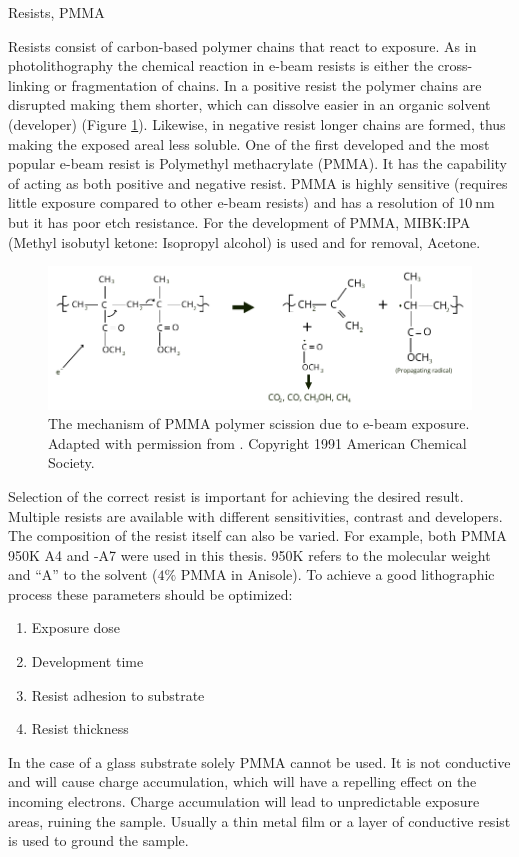 \documentclass[draft]{jyflluk}
\begin{document}
Resists, PMMA

Resists consist of carbon-based polymer chains that react to exposure. As in photolithography the chemical reaction in e-beam resists is either the cross-linking or fragmentation of chains. In a positive resist the polymer chains are disrupted making them shorter, which can dissolve easier in an organic solvent (developer) (Figure \ref{fig:PMMA_chem}). Likewise, in negative resist longer chains are formed, thus making the exposed areal less soluble. One of the first developed and the most popular e-beam resist is Polymethyl methacrylate (PMMA). It has the capability of acting as both positive and negative resist. PMMA is highly sensitive (requires little exposure compared to other e-beam resists) and has a resolution of $\SI{10}{\nano \metre}$ but it has poor etch resistance. For the development of PMMA, MIBK:IPA (Methyl isobutyl ketone: Isopropyl alcohol) is used and for removal, Acetone. \cite{EBL_GOOD}

\begin{figure}[h]
    \centering
    \includegraphics[width=1.0\textwidth]{images/PMMA_chem_eq.pdf}
    \caption{The mechanism of PMMA polymer scission due to e-beam exposure. Adapted with permission from \cite{moore_degradation_1991}. Copyright 1991 American Chemical Society.}
    \label{fig:PMMA_chem}
\end{figure}

Selection of the correct resist is important for achieving the desired result. Multiple resists are available with different sensitivities, contrast and developers. The composition of the resist itself can also be varied. For example, both PMMA 950K A4 and -A7 were used in this thesis.  950K refers to the molecular weight and “A” to the solvent ($4 \percent$ PMMA in Anisole). To achieve a good lithographic process these parameters should be optimized:
\begin{enumerate}
    \renewcommand{\labelenumi}{\Roman{enumi}} 
        \item Exposure dose
        \item Development time
        \item Resist adhesion to substrate
        \item Resist thickness
\end{enumerate}	
In the case of a glass substrate solely PMMA cannot be used. It is not conductive and  will cause charge accumulation, which will have a repelling effect on the incoming electrons. Charge accumulation will lead to unpredictable exposure areas, ruining the sample. Usually a thin metal film or a layer of conductive resist is used to ground the sample.
\end{document}
